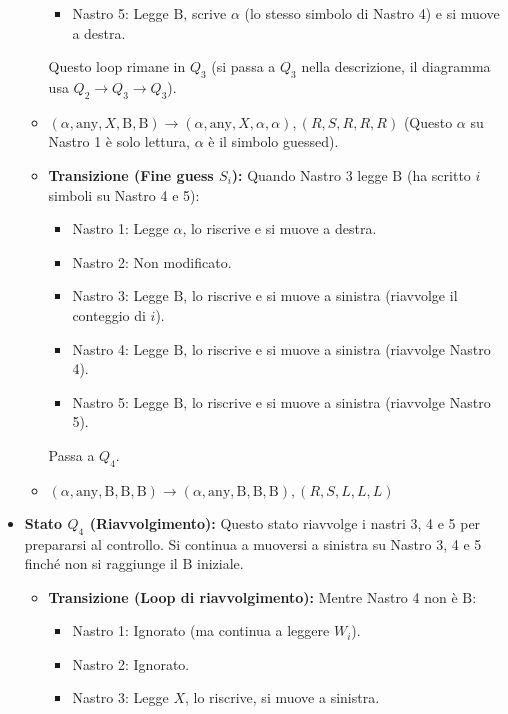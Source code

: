 \documentclass[a4paper]{article}
\newcommand{\B}{\text{B}} %
\newcommand{\alphaSym}{\alpha} %
\begin{document}
\begin{itemize}
\begin{itemize}
\begin{itemize}
                    \item Nastro 5: Legge $\B$, scrive $\alphaSym$ (lo stesso simbolo di Nastro 4) e si muove a destra.
                \end{itemize}
                Questo loop rimane in $Q_3$ (si passa a $Q_3$ nella descrizione, il diagramma usa $Q_2 \to Q_3 \to Q_3$).
                \item $(\alpha, \text{any}, X, \B, \B) \to (\alpha, \text{any}, X, \alphaSym, \alphaSym), (R,S,R,R,R)$ (Questo $\alpha$ su Nastro 1 è solo lettura, $\alphaSym$ è il simbolo guessed).
            \item \textbf{Transizione (Fine guess $S_i$):}
                Quando Nastro 3 legge $\B$ (ha scritto $i$ simboli su Nastro 4 e 5):
                \begin{itemize}
                    \item Nastro 1: Legge $\alpha$, lo riscrive e si muove a destra.
                    \item Nastro 2: Non modificato.
                    \item Nastro 3: Legge $\B$, lo riscrive e si muove a sinistra (riavvolge il conteggio di $i$).
                    \item Nastro 4: Legge $\B$, lo riscrive e si muove a sinistra (riavvolge Nastro 4).
                    \item Nastro 5: Legge $\B$, lo riscrive e si muove a sinistra (riavvolge Nastro 5).
                \end{itemize}
                Passa a $Q_4$.
                \item $(\alpha, \text{any}, \B, \B, \B) \to (\alpha, \text{any}, \B, \B, \B), (R,S,L,L,L)$
        \end{itemize}
    \item \textbf{Stato $Q_4$ (Riavvolgimento):}
        Questo stato riavvolge i nastri 3, 4 e 5 per prepararsi al controllo. Si continua a muoversi a sinistra su Nastro 3, 4 e 5 finché non si raggiunge il $\B$ iniziale.
        \begin{itemize}
            \item \textbf{Transizione (Loop di riavvolgimento):}
                Mentre Nastro 4 non è $\B$:
                \begin{itemize}
                    \item Nastro 1: Ignorato (ma continua a leggere $W_i$).
                    \item Nastro 2: Ignorato.
                    \item Nastro 3: Legge $X$, lo riscrive, si muove a sinistra.

\end{itemize}
\end{itemize}
\end{itemize}
\end{document}
